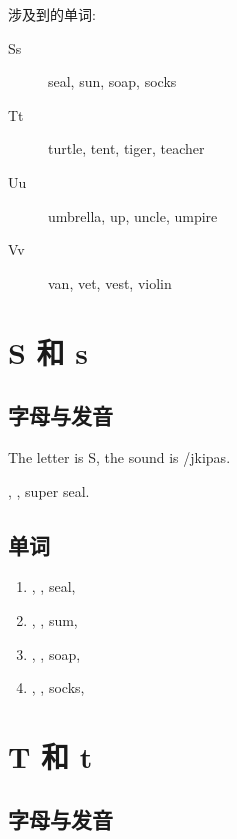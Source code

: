 \noindent 涉及到的单词:

\begin{description}
  \item[Ss] seal, sun, soap, socks
  \item[Tt] turtle, tent, tiger, teacher
  \item[Uu] umbrella, up, uncle, umpire 
  \item[Vv] van, vet, vest, violin 
\end{description}

\section{S 和 s}

\subsection{字母与发音}

The letter is S, the sound is /jkipa{s}.

, , super seal.


\subsection{单词}

\begin{enumerate}
  \item {}, , seal, 
  \item {}, , sum, 
  \item {}, , soap, 
  \item {}, , socks, 
\end{enumerate}




\section{T 和 t}

\subsection{字母与发音}

